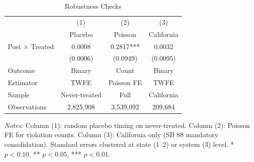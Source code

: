 \begin{table}[t]
\centering
\caption{Robustness Checks}
\label{tab:robust}
\begin{threeparttable}
\begin{tabular}{lccc}
\hline\hline
 & (1) & (2) & (3) \\
 & Placebo & Poisson & California \\
\hline
Post $\times$ Treated & 0.0008 & 0.2817*** & 0.0032 \\
 & (0.0006) & (0.0949) & (0.0095) \\
[0.5em]
Outcome & Binary & Count & Binary \\
Estimator & TWFE & Poisson FE & TWFE \\
Sample & Never-treated & Full & California \\
Observations & 2,825,908 & 3,539,092 & 209,684 \\
\hline\hline
\end{tabular}
\begin{tablenotes}[flushleft]\small
\item \textit{Notes:} Column (1): random placebo timing on never-treated. Column (2): Poisson FE for violation counts. Column (3): California only (SB 88 mandatory consolidation). Standard errors clustered at state (1--2) or system (3) level. * $p<0.10$, ** $p<0.05$, *** $p<0.01$.
\end{tablenotes}
\end{threeparttable}
\end{table}

